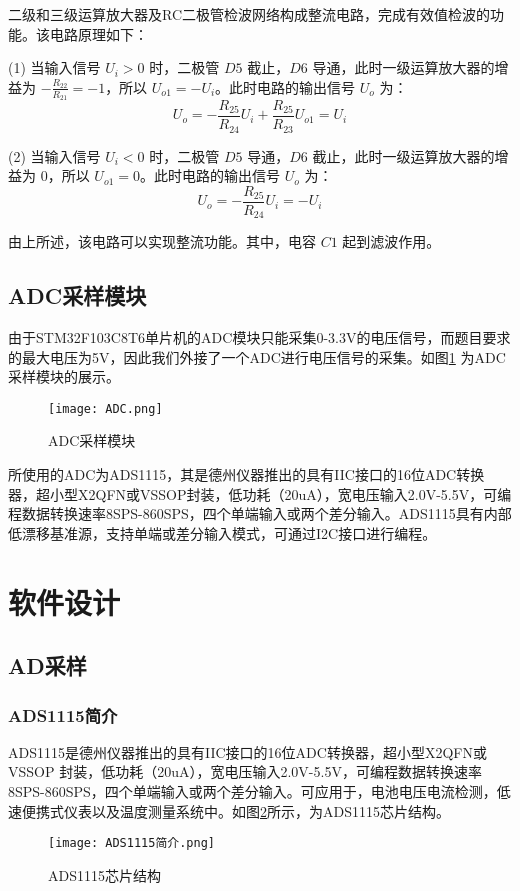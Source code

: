 \documentclass[lang=cn,11pt,a4paper]{elegantpaper}
\begin{document}
二级和三级运算放大器及RC二极管检波网络构成整流电路，完成有效值检波的功能。该电路原理如下：

(1) 当输入信号 \( U_i > 0 \) 时，二极管 \( D5 \) 截止，\( D6 \) 导通，此时一级运算放大器的增益为 \( -\frac{R_22}{R_21} = -1 \)，所以 \( U_{o1} = -U_i \)。此时电路的输出信号 \( U_o \) 为：
\[
  U_o = -\frac{R_25}{R_24} U_i + \frac{R_25}{R_23} U_{o1} = U_i
\]

(2) 当输入信号 \( U_i < 0 \) 时，二极管 \( D5 \) 导通，\( D6 \) 截止，此时一级运算放大器的增益为 0，所以 \( U_{o1} = 0 \)。此时电路的输出信号 \( U_o \) 为：
\[
  U_o = -\frac{R_25}{R_24} U_i = -U_i
\]

由上所述，该电路可以实现整流功能。其中，电容 \( C1 \) 起到滤波作用。

\subsection{ADC采样模块}
由于STM32F103C8T6单片机的ADC模块只能采集0-3.3V的电压信号，而题目要求的最大电压为5V，因此我们外接了一个ADC进行电压信号的采集。如图\ref{fig:adc_sampling} 为ADC采样模块的展示。

\begin{figure}[!htb]
  \centering
  \texttt{[image: ADC.png]}
  \caption{ADC采样模块}
  \label{fig:adc_sampling}
\end{figure}

所使用的ADC为ADS1115，其是德州仪器推出的具有IIC接口的16位ADC转换器，超小型X2QFN或VSSOP封装，低功耗（20uA），宽电压输入2.0V-5.5V，可编程数据转换速率8SPS-860SPS，四个单端输入或两个差分输入。ADS1115具有内部低漂移基准源，支持单端或差分输入模式，可通过I2C接口进行编程。


\section{软件设计}

\subsection{AD采样}
\subsubsection{ADS1115简介}
ADS1115是德州仪器推出的具有IIC接口的16位ADC转换器，超小型X2QFN或VSSOP 封装，低功耗（20uA），宽电压输入2.0V-5.5V，可编程数据转换速率8SPS-860SPS，四个单端输入或两个差分输入。可应用于，电池电压电流检测，低速便携式仪表以及温度测量系统中。如图\ref{fig:ADS1115芯片结构}所示，为ADS1115芯片结构。
\begin{figure}[!htb]
  \centering
  \texttt{[image: ADS1115简介.png]}
  \caption{ADS1115芯片结构}
  \label{fig:ADS1115芯片结构}
\end{figure}
\end{document}

